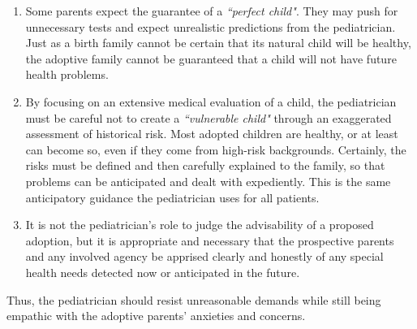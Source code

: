 \begin{enumerate}
    \item Some parents expect the guarantee of a \textit{``perfect child"}. They may push for unnecessary tests and expect unrealistic predictions from the pediatrician. Just as a birth family cannot be certain that its natural child will be healthy, the adoptive family cannot be guaranteed that a child will not have future health problems.
    \item By focusing on an extensive medical evaluation of a child, the pediatrician must be careful not to create a \textit{``vulnerable child"} through an exaggerated assessment of historical risk. Most adopted children are healthy, or at least can become so, even if they come from high-risk backgrounds. Certainly, the risks must be defined and then carefully explained to the family, so that problems can be anticipated and dealt with expediently. This is the same anticipatory guidance the pediatrician uses for all patients.
    \item It is not the pediatrician's role to judge the advisability of a proposed adoption, but it is appropriate and necessary that the prospective parents and any involved agency be apprised clearly and honestly of any special health needs detected now or anticipated in the future.
\end{enumerate}

Thus, the pediatrician should resist unreasonable demands while still being empathic with the adoptive parents' anxieties and concerns.




